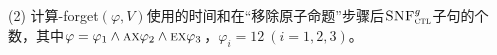 \documentclass[9pt, CJK]{beamer}
\begin{document}
\begin{frame}
{(2) 计算{\CTL-forget}$(\varphi, V)$使用的时间和在“移除原子命题”步骤后${\textsc{SNF}_{\textsc{ctl}}^g}$子句的个数，其中$\varphi=\varphi_1 \wedge \textsc{a}\textsc{x} \varphi_2 \wedge \textsc{e}\textsc{x} \varphi_3$，$\varphi_i=12~(i=1,2,3)$。

	\begin{figure}
		\centering
		\qquad
		\label{chapter04:fig:for12}
	\end{figure}
	}
\end{frame}
\end{document}

